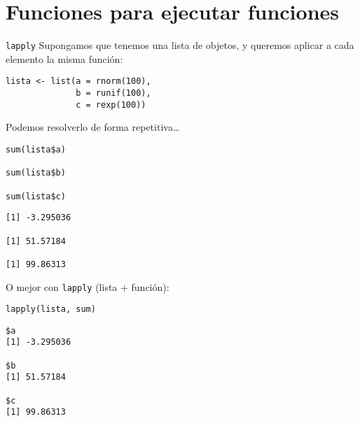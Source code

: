 \documentclass[xcolor={usenames,svgnames,dvipsnames}]{beamer}
\begin{document}
\section{Funciones para ejecutar funciones}
\label{sec:org51c9b1e}
\begin{frame}[label={sec:orga96fb82},fragile]{\texttt{lapply}}
 Supongamos que tenemos una lista de objetos, y queremos aplicar a cada elemento la misma función:
\lstset{language=r,label= ,caption= ,captionpos=b,numbers=none}
\begin{lstlisting}
lista <- list(a = rnorm(100),
              b = runif(100),
              c = rexp(100))
\end{lstlisting}

Podemos resolverlo de forma repetitiva\ldots{}
\lstset{language=r,label= ,caption= ,captionpos=b,numbers=none}
\begin{lstlisting}
sum(lista$a)

sum(lista$b)

sum(lista$c)
\end{lstlisting}

\begin{verbatim}
[1] -3.295036

[1] 51.57184

[1] 99.86313
\end{verbatim}


O mejor con \texttt{lapply} (lista + función):
\lstset{language=r,label= ,caption= ,captionpos=b,numbers=none}
\begin{lstlisting}
lapply(lista, sum)
\end{lstlisting}

\begin{verbatim}
$a
[1] -3.295036

$b
[1] 51.57184

$c
[1] 99.86313
\end{verbatim}
\end{frame}
\end{document}
